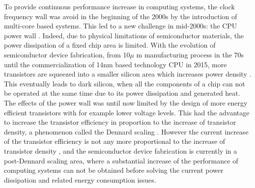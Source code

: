 \documentclass{article}
\begin{document}
To provide continuous performance increase in computing systems, the clock frequency wall was avoid in the beginning of the 2000s by the introduction of multi-core based systems. 
This led to a new challenge in mid-2000s: the CPU power wall \cite{Danowitz:12,Wang:13}. 
Indeed, due to physical limitations of semiconductor materials, the power dissipation of a fixed chip area is limited. 
With the evolution of semiconductor device fabrication, from 10$\mu$ m manufacturing process in the 70s until the commercialization of 14nm based technology CPU in 2015, more transistors are squeezed into a smaller silicon area which increases power density \cite{5514312}. 
This eventually leads to dark silicon, when all the components of a chip can not be operated at the same time due to its power dissipation and generated heat. 
The effects of the power wall was until now limited by the design of more energy efficient transistors with for example lower voltage levels.
This had the advantage to increase the transistor efficiency in proportion to the increase of transistor density, a phenomenon called the Dennard scaling \cite{Dennard:74}. 
However the current increase of the transistor efficiency is not any more proportional to the increase of transistor density \cite{Wang:13}, 
and the semiconductor device fabrication is currently in a post-Dennard scaling area, where a substantial increase of the performance of computing
systems can not be obtained before solving the current power dissipation and related energy consumption issues.
\end{document}
